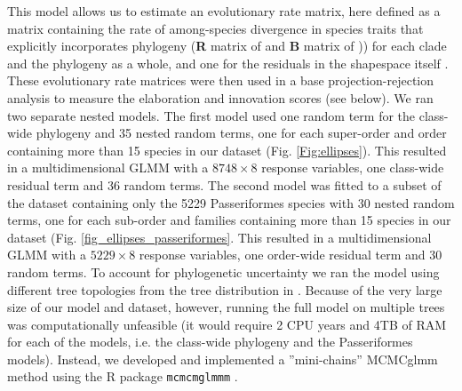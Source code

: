 \documentclass[12pt,letterpaper]{article}
\begin{document}
This model allows us to estimate an evolutionary rate matrix, here defined as a matrix containing the rate of among-species divergence in species traits that explicitly incorporates phylogeny (\textbf{R} matrix of \cite{Houle2017} and \textbf{B} matrix of \cite{ Machado2020})) for each clade and the phylogeny as a whole, and one for the residuals in the shapespace itself \cite{robinson2013quantifying}.
These evolutionary rate matrices were then used in a base projection-rejection analysis to measure the elaboration and innovation scores (see below).
We ran two separate nested models.
The first model used one random term for the class-wide phylogeny and 35 nested random terms, one for each super-order and order containing more than 15 species in our dataset (Fig.
\ref{Fig:ellipses}).
This resulted in a multidimensional GLMM with a $8748 \times 8$ response variables, one class-wide residual term and 36 random terms.
The second model was fitted to a subset of the dataset containing only the 5229 Passeriformes species with 30 nested random terms, one for each sub-order and families containing more than 15 species in our dataset (Fig.
\ref{fig_ellipses_passeriformes}.
This resulted in a multidimensional GLMM with a $5229 \times 8$ response variables, one order-wide residual term and 30 random terms.
To account for phylogenetic uncertainty we ran the model using different tree topologies from the tree distribution in \cite{jetz2012global}.
Because of the very large size of our model and dataset, however, running the full model on multiple trees was computationally unfeasible (it would require 2 CPU years and 4TB of RAM for each of the models, i.e. the class-wide phylogeny and the Passeriformes models).
Instead, we developed and implemented a ''mini-chains'' MCMCglmm method using the R package \texttt{mcmcmglmmm} \cite{mcmcmcglmmm}.
\end{document}
